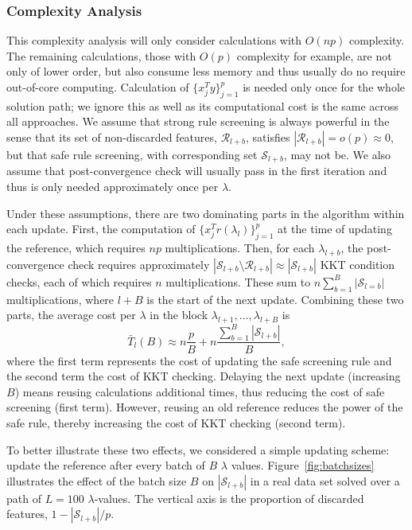 \documentclass[]{interact}
\theoremstyle{plain}%
\theoremstyle{definition}
\theoremstyle{remark}
\begin{document}
\subsubsection{Complexity Analysis}
\label{sec:complexity}

This complexity analysis will only consider calculations with $O(np)$ complexity. The remaining calculations, those with $O(p)$ complexity for example, are not only of lower order, but also consume less memory and thus usually do no require out-of-core computing. Calculation of $\{x_j^Ty\}_{j=1}^p$ is needed only once for the whole solution path; we ignore this as well as its computational cost is the same across all approaches. We assume that strong rule screening is always powerful in the sense that its set of non-discarded features, $\mathcal{R}_{l+b}$, satisfies $|\mathcal{R}_{l+b}|=o(p) \approx 0$, but that safe rule screening, with corresponding set $\mathcal{S}_{l+b}$, may not be. We also assume that post-convergence check will usually pass in the first iteration and thus is only needed approximately once per $\lambda$.

Under these assumptions, there are two dominating parts in the algorithm within each update. First, the computation of $\{x_j^Tr(\lambda_l)\}_{j=1}^p$ at the time of updating the reference, which requires $np$ multiplications. Then, for each $\lambda_{l+b}$, the post-convergence check requires approximately $|\mathcal{S}_{l+b} \setminus \mathcal{R}_{l+b}| \approx |\mathcal{S}_{l+b}|$ KKT condition checks, each of which requires $n$ multiplications. These sum to $n\sum_{b=1}^{B}|\mathcal{S}_{l=b}|$ multiplications, where $l+B$ is the start of the next update. Combining these two parts, the average cost per $\lambda$ in the block $\lambda_{l+1},...,\lambda_{l+B}$ is
\begin{equation}
    \label{eq:cost}
    \bar{T}_l(B) \approx n\frac{p}{B}+n\frac{\sum_{b=1}^B|\mathcal{S}_{l+b}|}{B},
\end{equation}
where the first term represents the cost of updating the safe screening rule and the second term the cost of KKT checking. Delaying the next update (increasing $B$) means reusing calculations additional times, thus reducing the cost of safe screening (first term). However, reusing an old reference reduces the power of the safe rule, thereby increasing the cost of KKT checking (second term).

To better illustrate these two effects, we considered a simple updating scheme: update the reference after every batch of $B$ $\lambda$ values. Figure~\ref{fig:batchsizes} illustrates the effect of the batch size $B$ on $|\mathcal{S}_{l+b}|$ in a real data set solved over a path of $L=100$ $\lambda$-values. The vertical axis is the proportion of discarded features, $1-|\mathcal{S}_{l+b}|/p$.
\end{document}
